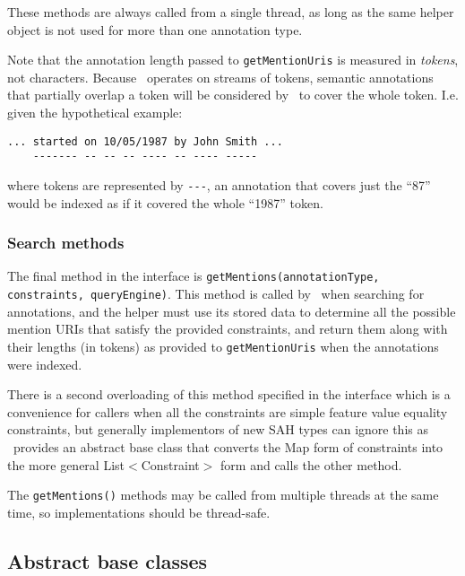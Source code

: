 These methods are always called from a single thread, as long as the same 
helper object is not used for more than one annotation type.

Note that the annotation length passed to {\tt getMentionUris} is measured in
{\em tokens}, not characters.  Because \Mimir\ operates on streams of tokens,
semantic annotations that partially overlap a token will be considered by
\Mimir\ to cover the whole token.  I.e. given the hypothetical example:

\begin{minipage}{\textwidth}
\begin{verbatim}
... started on 10/05/1987 by John Smith ...
    ------- -- -- -- ---- -- ---- -----
\end{verbatim}
\end{minipage}

where tokens are represented by \verb|---|, an annotation that covers just the
``87'' would be indexed as if it covered the whole ``1987'' token.

\subsubsection*{Search methods}

The final method in the interface is {\tt getMentions(annotationType,
constraints, queryEngine)}.  This method is called by \Mimir\ when searching
for annotations, and the helper must use its stored data to determine all the
possible mention URIs that satisfy the provided constraints, and return them
along with their lengths (in tokens) as provided to {\tt getMentionUris} when
the annotations were indexed.

There is a second overloading of this method specified in the interface which
is a convenience for callers when all the constraints are simple feature value
equality constraints, but generally implementors of new SAH types can ignore
this as \Mimir\ provides an abstract base class that converts the Map form of
constraints into the more general List$<$Constraint$>$ form and calls the other
method.

The {\tt getMentions()} methods may be called from multiple threads at the same
time, so implementations should be thread-safe.

\subsection{Abstract base classes}


